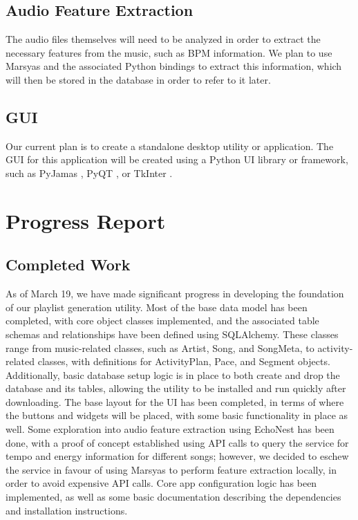 \documentclass{article}
\begin{document}
\subsection{Audio Feature Extraction}
The audio files themselves will need to be analyzed in order to extract the necessary features from the music, such as BPM information. We plan to use Marsyas and the associated Python bindings to extract this information, which will then be stored in the database in order to refer to it later.

\subsection{GUI}
Our current plan is to create a standalone desktop utility or application. The GUI for this application will be created using a Python UI library or framework, such as PyJamas \cite{Pyjs}, PyQT \cite{PyQT}, or TkInter \cite{TkInter}.

\section{Progress Report}
\subsection{Completed Work}
As of March 19, we have made significant progress in developing the foundation of our playlist generation utility. Most of the base data model has been completed, with core object classes implemented, and the associated table schemas and relationships have been defined using SQL\-Alchemy. These classes range from music-related classes, such as Artist, Song, and SongMeta, to activity-related cla\-sses, with definitions for ActivityPlan, Pace, and Segment objects. Additionally, basic database setup logic is in place to both create and drop the database and its tables, allowing the utility to be installed and run quickly after downloading. The base layout for the UI has been completed, in terms of where the buttons and widgets will be placed, with some basic functionality in place as well. Some exploration into audio feature extraction using EchoNest has been done, with a proof of concept established using API calls to query the service for tempo and energy information for different songs; however, we decided to eschew the service in favour of using Marsyas to perform feature extraction locally, in order to avoid expensive API calls. Core app configuration logic has been implemented, as well as some basic documentation describing the dependencies and installation instructions.
\end{document}
